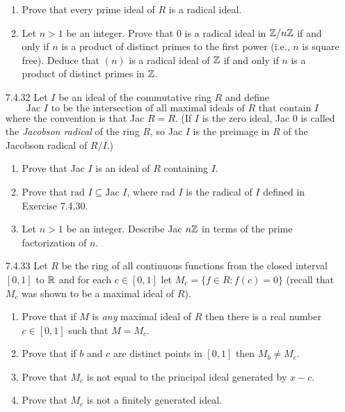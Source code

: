 \begin{enumerate}
\begin{enumerate}
                     \item Prove that every prime ideal of $R$ is a radical
                           ideal.
                     \item Let $n > 1$ be an integer. Prove that 0 is a radical
                           ideal in $\mathbb{Z}/n\mathbb{Z}$ if and only if $n$ is a product of
                           distinct primes to the first power (i.e., $n$ is
                           square free). Deduce that $(n)$ is a radical ideal of
                           $\mathbb{Z}$ if and only if $n$ is a product of distinct
                           primes in $\mathbb{Z}$.
                  \end{enumerate}
   \item[7.4.32]  Let $I$ be an ideal of the commutative ring $R$ and define
                  $$\text{Jac $I$ to be the intersection of all maximal ideals
                     of $R$ that contain $I$}$$
                  where the convention is that Jac $R = R$. (If $I$ is the zero
                  ideal, Jac 0 is called the \textit{Jacobson radical} of the
                  ring $R$, so Jac $I$ is the preimage in $R$ of the Jacobson
                  radical of $R/I$.)
                  \begin{enumerate}
                     \item Prove that Jac $I$ is an ideal of $R$ containing $I$.
                     \item Prove that $\text{rad } I \subseteq \text{Jac }I$,
                           where rad $I$ is the radical of $I$ defined in
                           Exercise 7.4.30.
                     \item Let $n > 1$ be an integer. Describe Jac $n\mathbb{Z}$ in
                           terms of the prime factorization of $n$.
                  \end{enumerate}
   \item[7.4.33]  Let $R$ be the ring of all continuous functions from the
                  closed interval $[0, 1]$ to $\mathbb{R}$ and for each $c \in [0, 1]$
                  let $M_c = \{f \in R : f(c) = 0\}$ (recall that $M_c$ was
                  shown to be a maximal ideal of $R$).
                  \begin{enumerate}
                     \item Prove that if $M$ is \textit{any} maximal ideal of
                           $R$ then there is a real number $c \in [0, 1]$ such
                           that $M = M_c$.
                     \item Prove that if $b$ and $c$ are distinct points in
                           $[0, 1]$ then $M_b \neq M_c$.
                     \item Prove that $M_c$ is not equal to the principal ideal
                           generated by $x - c$.
                     \item Prove that $M_c$ is not a finitely generated ideal.
                  \end{enumerate}
\end{enumerate}

